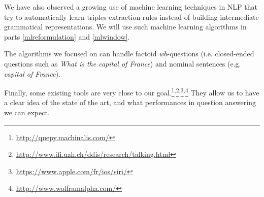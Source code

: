 We have also observed a growing use of machine learning techniques in NLP that try to automatically learn triples extraction rules instead of building intermediate grammatical representations. We will use such machine learning algorithms in parts \ref{mlreformulation} and \ref{mlwindow}.

The algorithms we focused on can handle factoid \textit{wh}-questions (i.e. closed-ended questions such as \textit{What is the capital of France}) and nominal sentences (e.g. \textit{capital of France}). 

Finally, some existing tools are very close to our goal.\footnote{\url{http://quepy.machinalis.com/}}\textsuperscript{,}\footnote{\url{http://www.ifi.uzh.ch/ddis/research/talking.html}}\textsuperscript{,}\footnote{\url{https://www.apple.com/fr/ios/siri/}}\textsuperscript{,}\footnote{\url{http://www.wolframalpha.com/}} They allow us to have a clear idea of the state of the art, and what performances in question answering we can expect.
